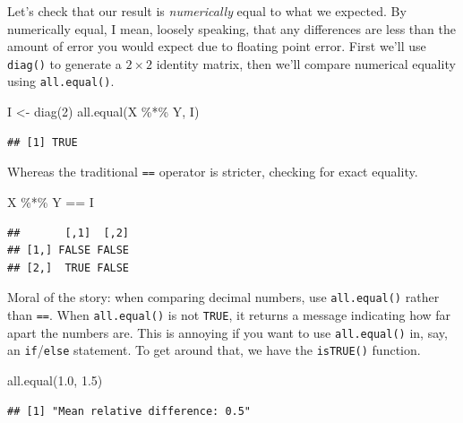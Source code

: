 \documentclass[
  12pt,
  oneside,openany]{book}
\newenvironment{Shaded}{\begin{snugshade}}{\end{snugshade}}
\newcommand{\DecValTok}[1]{\textcolor[rgb]{0.00,0.00,0.81}{#1}}
\newcommand{\FloatTok}[1]{\textcolor[rgb]{0.00,0.00,0.81}{#1}}
\newcommand{\FunctionTok}[1]{\textcolor[rgb]{0.00,0.00,0.00}{#1}}
\newcommand{\NormalTok}[1]{#1}
\newcommand{\OtherTok}[1]{\textcolor[rgb]{0.56,0.35,0.01}{#1}}
\newcommand{\SpecialCharTok}[1]{\textcolor[rgb]{0.00,0.00,0.00}{#1}}
\begin{document}
Let's check that our result is \emph{numerically} equal to what we expected. By numerically equal, I mean, loosely speaking, that any differences are less than the amount of error you would expect due to floating point error. First we'll use \texttt{diag()} to generate a \(2 \times 2\) identity matrix, then we'll compare numerical equality using \texttt{all.equal()}.

\begin{Shaded}
\begin{Highlighting}[]
\NormalTok{I }\OtherTok{\textless{}{-}} \FunctionTok{diag}\NormalTok{(}\DecValTok{2}\NormalTok{)}
\FunctionTok{all.equal}\NormalTok{(X }\SpecialCharTok{\%*\%}\NormalTok{ Y, I)}
\end{Highlighting}
\end{Shaded}

\begin{verbatim}
## [1] TRUE
\end{verbatim}

Whereas the traditional \texttt{==} operator is stricter, checking for exact equality.

\begin{Shaded}
\begin{Highlighting}[]
\NormalTok{X }\SpecialCharTok{\%*\%}\NormalTok{ Y }\SpecialCharTok{==}\NormalTok{ I}
\end{Highlighting}
\end{Shaded}

\begin{verbatim}
##       [,1]  [,2]
## [1,] FALSE FALSE
## [2,]  TRUE FALSE
\end{verbatim}

Moral of the story: when comparing decimal numbers, use \texttt{all.equal()} rather than \texttt{==}. When \texttt{all.equal()} is not \texttt{TRUE}, it returns a message indicating how far apart the numbers are. This is annoying if you want to use \texttt{all.equal()} in, say, an \texttt{if}/\texttt{else} statement. To get around that, we have the \texttt{isTRUE()} function.

\begin{Shaded}
\begin{Highlighting}[]
\FunctionTok{all.equal}\NormalTok{(}\FloatTok{1.0}\NormalTok{, }\FloatTok{1.5}\NormalTok{)}
\end{Highlighting}
\end{Shaded}

\begin{verbatim}
## [1] "Mean relative difference: 0.5"
\end{verbatim}
\end{document}
